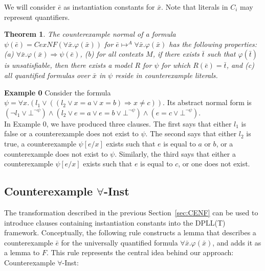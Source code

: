 \documentclass{llncs}
\newtheorem{thm}{Theorem}
\begin{document}
We will consider $\bar{e}$ as instantiation constants for $\bar{x}$.
Note that literals in $C_i$ may represent quantifiers.

\begin{thm}
The counterexample normal of a formula $\psi( \bar{e} ) = CexNF( \forall \bar{x}. \varphi( \bar{ x } ) )$ for $\bar{e} \mapsto^A \forall \bar{x}. \varphi( \bar{ x } )$ has the following properties:
(a) $\forall \bar{x}. \varphi( \bar{ x } ) \Rightarrow \psi( \bar{e} )$,
(b) for all contexts $M$, if there exists $\bar{t}$ such that $\varphi( \bar{t} )$ is unsatisfiable, then there exists a model $R$ for $\psi$ for which $R( \bar{e} ) = \bar{t}$, and
(c) all quantified formulas over $\bar{x}$ in $\psi$ reside in counterexample literals. \\
\end{thm}

{\bf Example 0}
Consider the formula $\psi = \forall x. (l_1 \vee (( l_2 \vee x = a \vee x = b ) \Rightarrow x \neq c))$.
Its abstract normal form is $( \neg l_1 \vee \bot^{\neg \psi}) \wedge ( l_2 \vee e = a \vee e = b \vee \bot^{\neg \psi} ) \wedge ( e = c \vee \bot^{\neg \psi})$. \\

In Example 0, we have produced three clauses.
The first says that either $l_1$ is false or a counterexample does not exist to $\psi$.
The second says that either $l_2$ is true, a counterexample $\psi[e/x]$ exists such that $e$ is equal to $a$ or $b$, or a counterexample does not exist to $\psi$. 
Similarly, the third says that either a counterexample $\psi[e/x]$ exists such that $e$ is equal to $c$, or one does not exist.

\subsection{Counterexample $\forall$-Inst}

The transformation described in the previous Section~\ref{sec:CENF} can be used to introduce clauses containing instantiation constants into the DPLL(T) framework.
Conceptually, the following rule constructs a lemma that describes a counterexample $\bar{e}$ for the universally quantified formula $\forall \bar{x}. \varphi( \bar{ x } )$, and adds it as a lemma to $F$.
This rule represents the central idea behind our approach: \\

\noindent Counterexample $\forall$-Inst: \\
\end{document}
